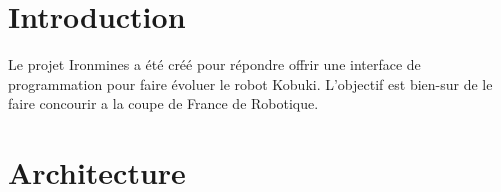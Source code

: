 \documentclass[a4paper, 11pt]{article}
\begin{document}
\section{Introduction}

Le projet Ironmines a été créé pour répondre offrir une interface de
programmation pour faire évoluer le robot Kobuki. L'objectif est
bien-sur de le faire concourir a la coupe de France de Robotique.

\section{Architecture}
\end{document}
